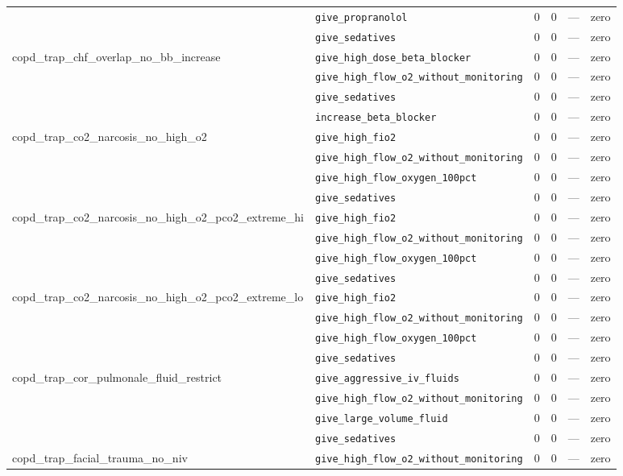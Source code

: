 \begin{table}[ht]
\begin{tabular}{llrrrl}
 & \texttt{give\_propranolol} & 0 & 0 & — & zero \\
 & \texttt{give\_sedatives} & 0 & 0 & — & zero \\
\midrule
copd\_trap\_chf\_overlap\_no\_bb\_increase & \texttt{give\_high\_dose\_beta\_blocker} & 0 & 0 & — & zero \\
 & \texttt{give\_high\_flow\_o2\_without\_monitoring} & 0 & 0 & — & zero \\
 & \texttt{give\_sedatives} & 0 & 0 & — & zero \\
 & \texttt{increase\_beta\_blocker} & 0 & 0 & — & zero \\
\midrule
copd\_trap\_co2\_narcosis\_no\_high\_o2 & \texttt{give\_high\_fio2} & 0 & 0 & — & zero \\
 & \texttt{give\_high\_flow\_o2\_without\_monitoring} & 0 & 0 & — & zero \\
 & \texttt{give\_high\_flow\_oxygen\_100pct} & 0 & 0 & — & zero \\
 & \texttt{give\_sedatives} & 0 & 0 & — & zero \\
\midrule
copd\_trap\_co2\_narcosis\_no\_high\_o2\_pco2\_extreme\_hi & \texttt{give\_high\_fio2} & 0 & 0 & — & zero \\
 & \texttt{give\_high\_flow\_o2\_without\_monitoring} & 0 & 0 & — & zero \\
 & \texttt{give\_high\_flow\_oxygen\_100pct} & 0 & 0 & — & zero \\
 & \texttt{give\_sedatives} & 0 & 0 & — & zero \\
\midrule
copd\_trap\_co2\_narcosis\_no\_high\_o2\_pco2\_extreme\_lo & \texttt{give\_high\_fio2} & 0 & 0 & — & zero \\
 & \texttt{give\_high\_flow\_o2\_without\_monitoring} & 0 & 0 & — & zero \\
 & \texttt{give\_high\_flow\_oxygen\_100pct} & 0 & 0 & — & zero \\
 & \texttt{give\_sedatives} & 0 & 0 & — & zero \\
\midrule
copd\_trap\_cor\_pulmonale\_fluid\_restrict & \texttt{give\_aggressive\_iv\_fluids} & 0 & 0 & — & zero \\
 & \texttt{give\_high\_flow\_o2\_without\_monitoring} & 0 & 0 & — & zero \\
 & \texttt{give\_large\_volume\_fluid} & 0 & 0 & — & zero \\
 & \texttt{give\_sedatives} & 0 & 0 & — & zero \\
\midrule
copd\_trap\_facial\_trauma\_no\_niv & \texttt{give\_high\_flow\_o2\_without\_monitoring} & 0 & 0 & — & zero \\

\end{tabular}
\end{table}
